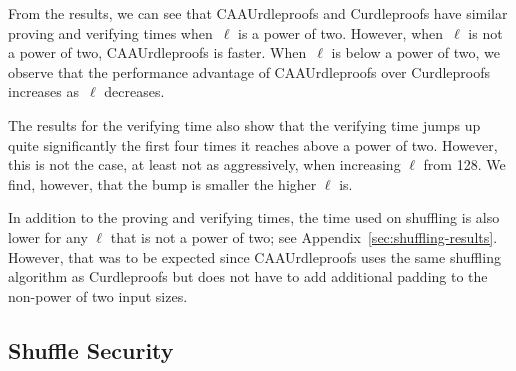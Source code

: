 From the results, we can see that CAAUrdleproofs and Curdleproofs have similar proving and verifying times when~$\ell$ is a power of two.
However, when~$\ell$ is not a power of two, CAAUrdleproofs is faster.
When~$\ell$ is below a power of two, we observe that the performance advantage of CAAUrdleproofs over Curdleproofs increases as~$\ell$ decreases.

The results for the verifying time also show that the verifying time jumps up quite significantly the first four times it reaches above a power of two.
However, this is not the case, at least not as aggressively, when increasing $\ell$ from 128.
We find, however, that the bump is smaller the higher $\ell$ is.

In addition to the proving and verifying times, the time used on shuffling is also lower for any $\ell$ that is not a power of two; see Appendix~\ref{sec:shuffling-results}.
However, that was to be expected since CAAUrdleproofs uses the same shuffling algorithm as Curdleproofs but does not have to add additional padding to the non-power of two input sizes.



\subsection{Shuffle Security}\label{subsec:Shuffle-security}

